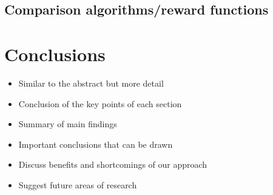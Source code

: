 \documentclass[letterpaper, 10 pt, conference]{ieeeconf}  %
\begin{document}
\subsection{Comparison algorithms/reward functions}

\section{Conclusions}

\begin{itemize}
      \item Similar to the abstract but more detail
      \item Conclusion of the key points of each section
      \item Summary of main findings
      \item Important conclusions that can be drawn
      \item Discuss benefits and shortcomings of our approach
      \item Suggest future areas of research
   \end{itemize}


\addtolength{\textheight}{-12cm}   %


















\newpage





\newpage

\appendices
\end{document}
